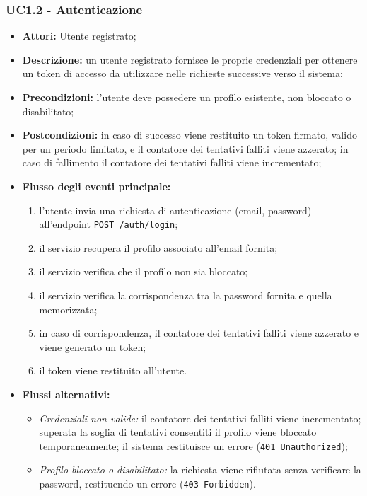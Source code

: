 \subsubsection{UC1.2 - Autenticazione}
\begin{itemize}
    \item \textbf{Attori:} Utente registrato;
    \item \textbf{Descrizione:} un utente registrato fornisce le proprie credenziali per ottenere un token di accesso da utilizzare nelle richieste successive verso il sistema;
    \item \textbf{Precondizioni:} l'utente deve possedere un profilo esistente, non bloccato o disabilitato;
    \item \textbf{Postcondizioni:} in caso di successo viene restituito un token firmato, valido per un periodo limitato, e il contatore dei tentativi falliti viene azzerato; in caso di fallimento il contatore dei tentativi falliti viene incrementato;
    \item \textbf{Flusso degli eventi principale:}
    \begin{enumerate}
        \item l'utente invia una richiesta di autenticazione (email, password) all'endpoint \texttt{POST \url{/auth/login}};
        \item il servizio recupera il profilo associato all'email fornita;
        \item il servizio verifica che il profilo non sia bloccato;
        \item il servizio verifica la corrispondenza tra la password fornita e quella memorizzata;
        \item in caso di corrispondenza, il contatore dei tentativi falliti viene azzerato e viene generato un token;
        \item il token viene restituito all'utente.
    \end{enumerate}
    \item \textbf{Flussi alternativi:}
    \begin{itemize}
        \item \emph{Credenziali non valide:} il contatore dei tentativi falliti viene incrementato; superata la soglia di tentativi consentiti il profilo viene bloccato temporaneamente; il sistema restituisce un errore (\texttt{401 Unauthorized});
        \item \emph{Profilo bloccato o disabilitato:} la richiesta viene rifiutata senza verificare la password, restituendo un errore (\texttt{403 Forbidden}).
    \end{itemize}
\end{itemize}